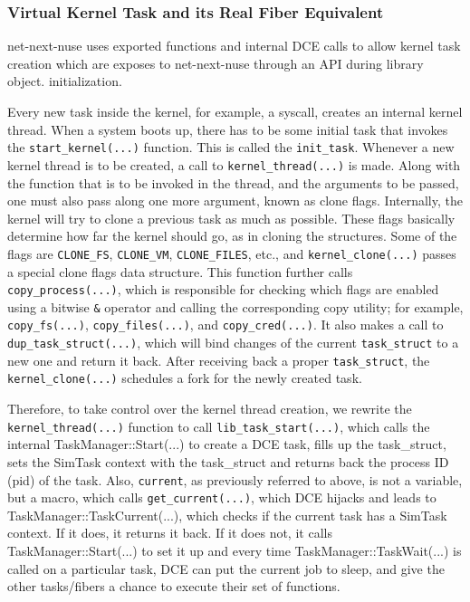 \documentclass{sig-alternate}
\begin{document}
\subsubsection{Virtual Kernel Task and its Real Fiber Equivalent}
net-next-nuse uses exported functions and internal DCE calls to allow kernel task creation  which are exposes to net-next-nuse through an API during library object.
initialization.

\sloppy Every new task inside the kernel, for example, a syscall, 
creates an internal kernel thread.  When a system boots up, there has to be some initial task that invokes the \texttt{start\_kernel(...)} 
function. This is called the \texttt{init\_task}. Whenever a new kernel thread is to be created, a call to \texttt{kernel\_thread(...)} is made. Along with the 
function that is to be invoked in the thread, and the arguments to be passed, one must also pass along one more argument, known as clone flags. 
Internally, the kernel will try to clone a previous task as much as possible. These flags basically determine 
how far the kernel should go, as in cloning the structures. Some of the flags are \texttt{CLONE\_FS}, \texttt{CLONE\_VM}, \texttt{CLONE\_FILES}, etc., 
and \texttt{kernel\_clone(...)} passes a special clone flags data structure. This function further calls \texttt{copy\_process(...)}, which is responsible for checking 
which flags are enabled using a bitwise \texttt{\&} operator and calling the corresponding copy utility; for example, \texttt{copy\_fs(...)}, \texttt{copy\_files(...)}, 
and \texttt{copy\_cred(...)}.  It also makes a call to \texttt{dup\_task\_struct(...)}, which will bind changes of the current \texttt{task\_struct} to a new one and 
return it back. After receiving back a proper \texttt{task\_struct}, the \texttt{kernel\_clone(...)} schedules a fork for the newly created task.

\sloppy Therefore, to take  control over the kernel thread creation, we rewrite the \texttt{kernel\_thread(...)} function to call 
\texttt{lib\_task\_start(...)}, which calls the 
internal TaskManager::Start(...) to create a DCE task, fills up the task\_struct, sets the SimTask context with the task\_struct and returns back 
the process ID (pid) of the task. Also, \texttt{current}, as previously referred to above, is not a variable, but a macro, which calls \texttt{get\_current(...)}, which DCE hijacks and leads to TaskManager::TaskCurrent(...), which checks if the current task has a SimTask context. If it does, it returns it back. 
If it does not, it calls TaskManager::Start(...) to set it up and every time 
TaskManager::TaskWait(...)  is called on a particular task, DCE can put the current job to sleep, and give the other tasks/fibers a chance to 
execute their set of functions. 
 
\end{document}
